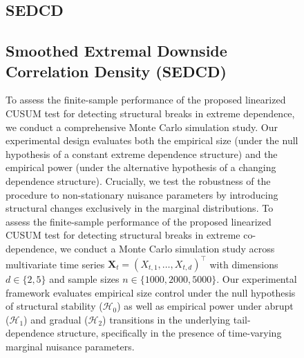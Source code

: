 \documentclass[10pt, a4paper]{article}
\theoremstyle{assumption}
\theoremstyle{definition}
\theoremstyle{theorem}
\begin{document}
\begin{figure}



\subsection{SEDCD}
\subsection{Smoothed Extremal Downside Correlation Density (SEDCD)}\label{sec:sim_sedcd}

To assess the finite-sample performance of the proposed linearized CUSUM test for detecting structural breaks in extreme dependence, we conduct a comprehensive Monte Carlo simulation study. Our experimental design evaluates both the empirical size (under the null hypothesis of a constant extreme dependence structure) and the empirical power (under the alternative hypothesis of a changing dependence structure). Crucially, we test the robustness of the procedure to non-stationary nuisance parameters by introducing structural changes exclusively in the marginal distributions.
To assess the finite-sample performance of the proposed linearized CUSUM test for detecting structural breaks in extreme co-dependence, we conduct a Monte Carlo simulation study across multivariate time series $\boldsymbol{X}_{t} = (X_{t,1}, \dots, X_{t,d})^\top$ with dimensions $d \in \{2, 5\}$ and sample sizes $n \in \{1000, 2000, 5000\}$. Our experimental framework evaluates empirical size control under the null hypothesis of structural stability ($\mathcal{H}_0$) as well as empirical power under abrupt ($\mathcal{H}_1$) and gradual ($\mathcal{H}_2$) transitions in the underlying tail-dependence structure, specifically in the presence of time-varying marginal nuisance parameters.


\end{figure}
\end{document}
